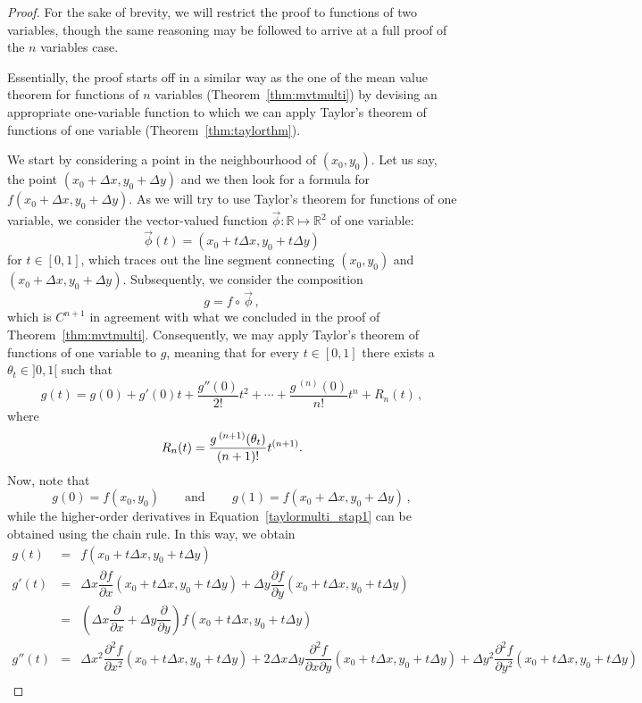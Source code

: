 \ifanalysis


\begin{proof}
For the sake of brevity, we will restrict the proof to functions of two variables, though the same reasoning may be followed to arrive at a full proof of the $n$ variables case. 

Essentially, the proof starts off in a similar way as the one of the mean value theorem for functions of $n$ variables (Theorem~\ref{thm:mvtmulti})  by devising an appropriate one-variable function to which we can apply Taylor's theorem of functions of one variable (Theorem~\ref{thm:taylorthm}).

We start by considering a point in the neighbourhood of $(x_0,y_0)$. Let us say, the point  $(x_0+\Delta x,y_0+\Delta y)$ and we then look for a formula for $f(x_0+\Delta x,y_0+\Delta y)$. As we will try to use Taylor's theorem for functions of one variable, we consider the  vector-valued function $\vec{\phi}:\mathbb{R}\mapsto\mathbb{R}^2$ of one variable:
$$
\vec{\phi}(t)=(x_0+t\Delta x,y_0+t\Delta y)
$$
for $t\in[0,1]$, which traces out the line segment connecting $(x_0,y_0)$ and $(x_0+\Delta x,y_0+\Delta y)$. Subsequently, we consider the composition
$$
g=f\circ\,\vec{\phi}\,,
$$
which is $C^{n+1}$ in agreement with what we concluded in the proof of Theorem~\ref{thm:mvtmulti}. Consequently, we may apply Taylor's theorem of functions of one variable to $g$, meaning that for every $t\in[0,1]$ there exists a $\theta_t\in]0,1[$ such that
\begin{equation}
g(t)=g(0) + g'(0)t + \frac{g''(0)}{2!}t^2+ \cdots +\frac{g\,^{(n)}(0)}{n!}t^n+R_n(t)\,,
\label{taylormulti_stap1}
\end{equation}
where 
$$\displaystyle R_n(t) = \frac{g\,^{(n+1)}(\theta_t)}{(n+1)!}t^{(n+1)}.$$
Now, note that
$$
g(0)=f(x_0,y_0)\qquad\text{and}\qquad\,g(1)=f(x_0+\Delta x,y_0+\Delta y)\,,
$$
while the higher-order derivatives in Equation~\eqref{taylormulti_stap1} can be obtained using the chain rule. In this way, we obtain
\allowdisplaybreaks
\begin{eqnarray*}
g(t)&=&f(x_0+t\Delta x,y_0+t\Delta y)\\
g'(t)&=&\Delta x\dfrac{\partial f}{\partial x}(x_0+t\Delta x,y_0+t\Delta y)+\Delta y\dfrac{\partial f}{\partial y}(x_0+t\Delta x,y_0+t\Delta y)\\[0.2cm]
&=&\left(\Delta x\dfrac{\partial}{\partial x}+\Delta y\dfrac{\partial}{\partial y}\right)f(x_0+t\Delta x,y_0+t\Delta y)\\[0.2cm]
g''(t)&=&\Delta x^2\dfrac{\partial^2 f}{\partial x^2}(x_0+t\Delta x,y_0+t\Delta y)+2\Delta x\Delta y\dfrac{\partial^2 f}{\partial x\partial y}(x_0+t\Delta x,y_0+t\Delta y)+\Delta y^2\dfrac{\partial^2 f}{\partial y^2}(x_0+t\Delta x,y_0+t\Delta y)\\[0.2cm]

\end{eqnarray*}
\end{proof}
